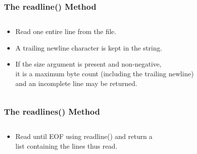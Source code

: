 \documentclass{../py-lecture}
\begin{document}
\begin{frame}[fragile]
	\frametitle{The readline() Method}
	\begin{columns}[c]
		\begin{column}{30cm}
			\vspace{.1cm}
			\begin{itemize}
				\item Read one entire line from the file.
				\item A trailing newline character is kept in the string.
				\item If the size argument is present and non-negative, \\
				it is a maximum byte count (including the trailing newline) \\
				and an incomplete line may be returned.
			\end{itemize}
		\end{column}
	\end{columns}
\end{frame}

\begin{frame}[fragile]
	\frametitle{The readlines() Method}
	\begin{columns}[c]
		\begin{column}{30cm}
			\vspace{.1cm}
			\begin{itemize}
				\item Read until EOF using readline() and return a \\
				 list containing the lines thus read.
			\end{itemize}
		\end{column}
	\end{columns}
\end{frame}
\end{document}
